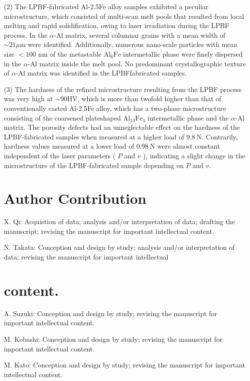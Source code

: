 \documentclass[10pt]{article}
\begin{document}
(2) The LPBF-fabricated Al-2.5Fe alloy samples exhibited a peculiar microstructure, which consisted of multi-scan melt pools that resulted from local melting and rapid solidification, owing to laser irradiation during the LPBF process. In the $\alpha$-Al matrix, several columnar grains with a mean width of $\sim 21 \mu \mathrm{m}$ were identified. Additionally, numerous nano-scale particles with mean size $<100$ $\mathrm{nm}$ of the metastable $\mathrm{Al}_{6} \mathrm{Fe}$ intermetallic phase were finely dispersed in the $\alpha$-Al matrix inside the melt pool. No predominant crystallographic texture of $\alpha$-Al matrix was identified in the LPBFfabricated samples.

(3) The hardness of the refined microstructure resulting from the LPBF process was very high at $\sim 90 \mathrm{HV}$, which is more than twofold higher than that of conventionally casted Al-2.5Fe alloy, which has a two-phase microstructure consisting of the coarsened plateshaped $\mathrm{Al}_{13} \mathrm{Fe}_{4}$ intermetallic phase and the $\alpha$-Al matrix. The porosity defects had an unneglectable effect on the hardness of the LPBF-fabricated samples when measured at a higher load of $9.8 \mathrm{~N}$. Contrarily, hardness values measured at a lower load of $0.98 \mathrm{~N}$ were almost constant independent of the laser parameters ( $P$ and $v$ ), indicating a slight change in the microstructure of the LPBF-fabricated sample depending on $P$ and $v$.

\section*{Author Contribution}
X. Qi: Acquistion of data; analysis and/or interpretation of data; drafting the manuscript; revising the manuscript for important intellectual content.

N. Takata: Conception and design by study; analysis and/or interpretation of data; revising the manuscript for important intellectual

\section*{content.}
A. Suzuki: Conception and design by study; revising the manuscript for important intellectual content.

M. Kobashi: Conception and design by study; revising the manuscript for important intellectual content.

M. Kato: Conception and design by study; revising the manuscript for important intellectual content.
\end{document}
